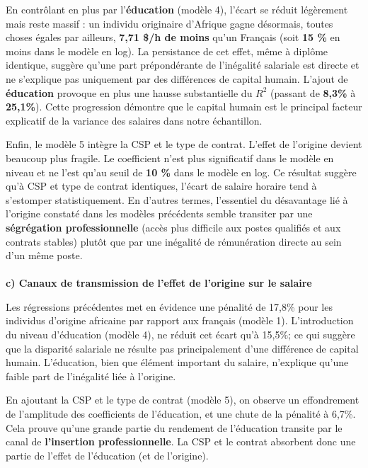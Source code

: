 \documentclass[
  letterpaper,
  DIV=11,
  numbers=noendperiod]{scrartcl}
\makeatletter
\let\oldparagraph\paragraph
\renewcommand{\paragraph}{
    \@ifstar
      \xxxParagraphStar
      \xxxParagraphNoStar
  }
\newcommand{\xxxParagraphStar}[1]{\oldparagraph*{#1}\mbox{}}
\newcommand{\xxxParagraphNoStar}[1]{\oldparagraph{#1}\mbox{}}
\makeatother
\begin{document}
En contrôlant en plus par l'\textbf{éducation} (modèle 4), l'écart se
réduit légèrement mais reste massif : un individu originaire d'Afrique
gagne désormais, toutes choses égales par ailleurs, \textbf{7,71 \$/h de
moins} qu'un Français (soit \textbf{15 \%} en moins dans le modèle en
log). La persistance de cet effet, même à diplôme identique, suggère
qu'une part prépondérante de l'inégalité salariale est directe et ne
s'explique pas uniquement par des différences de capital humain. L'ajout
de \textbf{éducation} provoque en plus une hausse substantielle du
\(R^2\) (passant de \textbf{8,3\%} à \textbf{25,1\%}). Cette progression
démontre que le capital humain est le principal facteur explicatif de la
variance des salaires dans notre échantillon.

Enfin, le modèle 5 intègre la CSP et le type de contrat. L'effet de
l'origine devient beaucoup plus fragile. Le coefficient n'est plus
significatif dans le modèle en niveau et ne l'est qu'au seuil de
\textbf{10 \%} dans le modèle en log. Ce résultat suggère qu'à CSP et
type de contrat identiques, l'écart de salaire horaire tend à s'estomper
statistiquement. En d'autres termes, l'essentiel du désavantage lié à
l'origine constaté dans les modèles précédents semble transiter par une
\textbf{ségrégation professionnelle} (accès plus difficile aux postes
qualifiés et aux contrats stables) plutôt que par une inégalité de
rémunération directe au sein d'un même poste.

\paragraph{\texorpdfstring{\textbf{c) Canaux de transmission de l'effet
de l'origine sur le
salaire}}{c) Canaux de transmission de l'effet de l'origine sur le salaire}}\label{c-canaux-de-transmission-de-leffet-de-lorigine-sur-le-salaire}

Les régressions précédentes met en évidence une pénalité de 17,8\% pour
les individus d'origine africaine par rapport aux français (modèle 1).
L'introduction du niveau d'éducation (modèle 4), ne réduit cet écart
qu'à 15,5\%; ce qui suggère que la disparité salariale ne résulte pas
principalement d'une différence de capital humain. L'éducation, bien que
élément important du salaire, n'explique qu'une faible part de
l'inégalité liée à l'origine.

En ajoutant la CSP et le type de contrat (modèle 5), on observe un
effondrement de l'amplitude des coefficients de l'éducation, et une
chute de la pénalité à 6,7\%. Cela prouve qu'une grande partie du
rendement de l'éducation transite par le canal de \textbf{l'insertion
professionnelle}. La CSP et le contrat absorbent donc une partie de
l'effet de l'éducation (et de l'origine).
\end{document}
